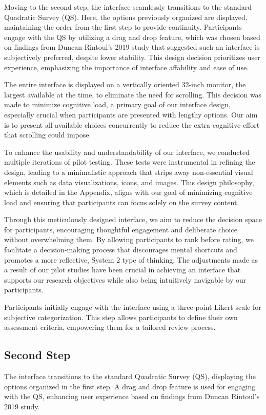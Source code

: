 Moving to the second step, the interface seamlessly transitions to the standard Quadratic Survey (QS). Here, the options previously organized are displayed, maintaining the order from the first step to provide continuity. Participants engage with the QS by utilizing a drag and drop feature, which was chosen based on findings from Duncan Rintoul's 2019 study that suggested such an interface is subjectively preferred, despite lower stability. This design decision prioritizes user experience, emphasizing the importance of interface affability and ease of use.

The entire interface is displayed on a vertically oriented 32-inch monitor, the largest available at the time, to eliminate the need for scrolling. This decision was made to minimize cognitive load, a primary goal of our interface design, especially crucial when participants are presented with lengthy options. Our aim is to present all available choices concurrently to reduce the extra cognitive effort that scrolling could impose.

To enhance the usability and understandability of our interface, we conducted multiple iterations of pilot testing. These tests were instrumental in refining the design, leading to a minimalistic approach that strips away non-essential visual elements such as data visualizations, icons, and images. This design philosophy, which is detailed in the Appendix, aligns with our goal of minimizing cognitive load and ensuring that participants can focus solely on the survey content.

Through this meticulously designed interface, we aim to reduce the decision space for participants, encouraging thoughtful engagement and deliberate choice without overwhelming them. By allowing participants to rank before rating, we facilitate a decision-making process that discourages mental shortcuts and promotes a more reflective, System 2 type of thinking. The adjustments made as a result of our pilot studies have been crucial in achieving an interface that supports our research objectives while also being intuitively navigable by our participants.

Participants initially engage with the interface using a three-point Likert scale for subjective categorization. This step allows participants to define their own assessment criteria, empowering them for a tailored review process.

\subsection{Second Step}
The interface transitions to the standard Quadratic Survey (QS), displaying the options organized in the first step. A drag and drop feature is used for engaging with the QS, enhancing user experience based on findings from Duncan Rintoul's 2019 study.

